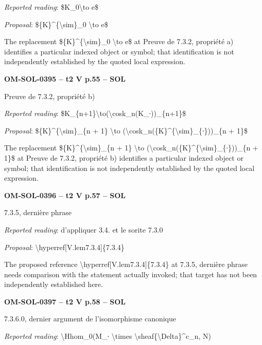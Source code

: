 \emph{Reported reading}: \$K\_0\textbackslash{}to e\$\par
\emph{Proposal}: \$\{K\}\textasciicircum{}\{\textbackslash{}sim\}\_0 \textbackslash{}to e\$\par
The replacement \$\{K\}\textasciicircum{}\{\textbackslash{}sim\}\_0 \textbackslash{}to e\$ at Preuve de 7.3.2, propriété a) identifies a particular indexed object or symbol; that identification is not independently established by the quoted local expression.\par
\par\noindent\textbf{OM-SOL-0395 -- t2 V p.55 -- SOL}\par
Preuve de 7.3.2, propriété b)\par
\emph{Reported reading}: \$K\_\{n+1\}\textbackslash{}to(\textbackslash{}cosk\_n(K\_∙))\_\{n+1\}\$\par
\emph{Proposal}: \$\{K\}\textasciicircum{}\{\textbackslash{}sim\}\_\{n + 1\} \textbackslash{}to (\textbackslash{}cosk\_n(\{K\}\textasciicircum{}\{\textbackslash{}sim\}\_\{∙\}))\_\{n + 1\}\$\par
The replacement \$\{K\}\textasciicircum{}\{\textbackslash{}sim\}\_\{n + 1\} \textbackslash{}to (\textbackslash{}cosk\_n(\{K\}\textasciicircum{}\{\textbackslash{}sim\}\_\{∙\}))\_\{n + 1\}\$ at Preuve de 7.3.2, propriété b) identifies a particular indexed object or symbol; that identification is not independently established by the quoted local expression.\par
\par\noindent\textbf{OM-SOL-0396 -- t2 V p.57 -- SOL}\par
7.3.5, dernière phrase\par
\emph{Reported reading}: d'appliquer 3.4. et le sorite 7.3.0\par
\emph{Proposal}: \textbackslash{}hyperref[V.lem7.3.4]\{7.3.4\}\par
The proposed reference \textbackslash{}hyperref[V.lem7.3.4]\{7.3.4\} at 7.3.5, dernière phrase needs comparison with the statement actually invoked; that target has not been independently established here.\par
\par\noindent\textbf{OM-SOL-0397 -- t2 V p.58 -- SOL}\par
7.3.6.0, dernier argument de l'isomorphisme canonique\par
\emph{Reported reading}: \textbackslash{}Hhom\_0(M\_∙ \textbackslash{}times \textbackslash{}sheaf\{\textbackslash{}Delta\}\textasciicircum{}c\_n, N)\par

